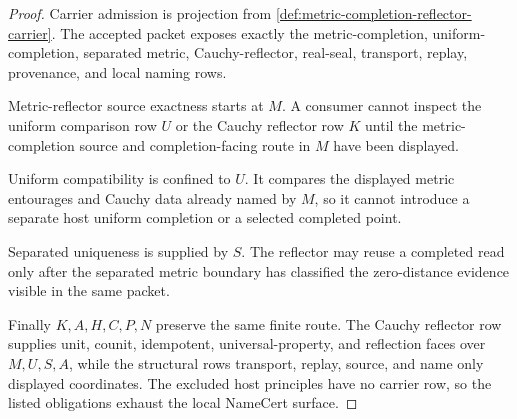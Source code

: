 \begin{proof}
Carrier admission is projection from \autoref{def:metric-completion-reflector-carrier}. The accepted packet exposes exactly the metric-completion, uniform-completion, separated metric, Cauchy-reflector, real-seal, transport, replay, provenance, and local naming rows.

Metric-reflector source exactness starts at $M$. A consumer cannot inspect the uniform comparison row $U$ or the Cauchy reflector row $K$ until the metric-completion source and completion-facing route in $M$ have been displayed.

Uniform compatibility is confined to $U$. It compares the displayed metric entourages and Cauchy data already named by $M$, so it cannot introduce a separate host uniform completion or a selected completed point.

Separated uniqueness is supplied by $S$. The reflector may reuse a completed read only after the separated metric boundary has classified the zero-distance evidence visible in the same packet.

Finally $K,A,H,C,P,N$ preserve the same finite route. The Cauchy reflector row supplies unit, counit, idempotent, universal-property, and reflection faces over $M,U,S,A$, while the structural rows transport, replay, source, and name only displayed coordinates. The excluded host principles have no carrier row, so the listed obligations exhaust the local NameCert surface.
\end{proof}

